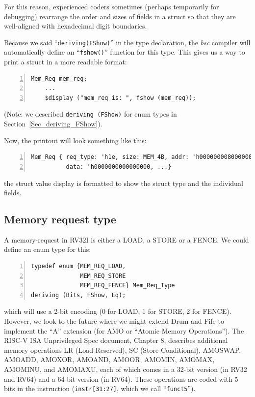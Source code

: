 For this reason, experienced {\BSV} coders sometimes (perhaps
temporarily for debugging) rearrange the order and sizes of fields in
a struct so that they are well-aligned with hexadecimal digit
boundaries.


Because we said ``\verb|deriving(FShow)|'' in the type declaration,
the \emph{bsc} compiler will automatically define an
``\verb|fshow()|'' function for this type.  This gives us a way to
print a struct in a more readable format:

{\footnotesize
\begin{Verbatim}[frame=single, numbers=left]
    Mem_Req mem_req;
    ...
    $display ("mem_req is: ", fshow (mem_req));
\end{Verbatim}
}

{\footnotesize
(Note: we described \verb|deriving (FShow)| for enum types in
Section~\ref{Sec_deriving_FShow}).}

Now, the printout will look something like this:

{\footnotesize
\begin{Verbatim}[frame=single, numbers=left]
Mem_Req { req_type: 'h1e, size: MEM_4B, addr: 'h0000000080000000,
          data: 'h0000000000000000, ...}
\end{Verbatim}
}

{\ie} the struct value display is formatted to show the struct type
and the individual fields.


\subsection{Memory request type}

\label{Sec_Mem_Req_Type}

A memory-request in RV32I is either a LOAD, a STORE or a FENCE.  We
could define an enum type for this:

{\footnotesize
\begin{Verbatim}[frame=single, numbers=left]
typedef enum {MEM_REQ_LOAD,
              MEM_REQ_STORE
              MEM_REQ_FENCE} Mem_Req_Type
deriving (Bits, FShow, Eq);
\end{Verbatim}
}

which will use a 2-bit encoding (0 for LOAD, 1 for STORE, 2 for
FENCE).  However, we look to the future where we might extend Drum and
Fife to implement the ``A'' extension (for AMO or ``Atomic Memory
Operations'').  The RISC-V ISA Unprivileged Spec document, Chapter 8,
describes additional memory operations LR (Load-Reserved), SC
(Store-Conditional), AMOSWAP, AMOADD, AMOXOR, AMOAND, AMOOR, AMOMIN,
AMOMAX, AMOMINU, and AMOMAXU, each of which comes in a 32-bit version
(in RV32 and RV64) and a 64-bit version (in RV64).  These operations
are coded with 5 bits in the instruction (\verb|instr[31:27]|, which
we call ``{\tt funct5}'').

